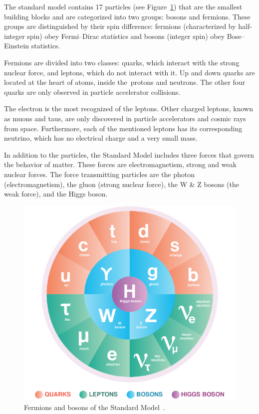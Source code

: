 The standard model contains 17 particles (see Figure~\ref{fig_standard})  that are the smallest building blocks and are categorized into two groups: bosons and fermions. These groups are distinguished by their spin difference: fermions (characterized by half-integer spin) obey Fermi–Dirac statistics and bosons (integer spin) obey Bose–Einstein statistics. 

Fermions are divided into two classes: quarks, which interact with the strong nuclear force, and leptons, which do not interact with it. Up and down quarks are located at the heart of atoms, inside the protons and neutrons. The other four quarks are only observed in particle accelerator collisions.

The electron is the most recognized of the leptons. Other charged leptons, known as muons and taus, are only discovered in particle accelerators and cosmic rays from space. Furthermore, each of the mentioned leptons has its corresponding neutrino, which has no electrical charge and a very small mass.

In addition to the particles, the Standard Model includes three forces that govern the behavior of matter. These forces are electromagnetism, strong and weak nuclear forces. The force transmitting particles are the photon (electromagnetism), the gluon (strong nuclear force), the W \& Z bosons (the weak force), and the Higgs boson.

\begin{figure}[!h]
\centering
\includegraphics[width=0.7\columnwidth]{Chapter1/images/particles.png}
\caption{Fermions and bosons of the Standard Model~\cite{standard_model}.}
\label{fig_standard}
\end{figure}

\newpage

